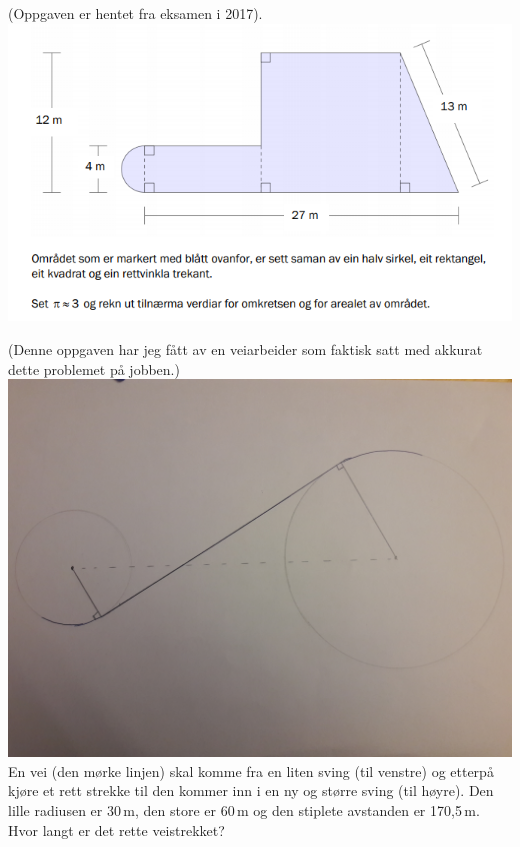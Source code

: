 (Oppgaven er hentet fra eksamen i 2017).\\
\includegraphics[scale=0.55]{eksv17}

\newpage
{}
(Denne oppgaven har jeg fått av en veiarbeider som faktisk satt med akkurat dette problemet på jobben.)\os
\includegraphics[scale=0.07]{vei}\os
En vei (den mørke linjen) skal komme fra en liten sving (til venstre) og etterpå kjøre et rett strekke til den kommer inn i en ny og større sving (til høyre).\os
Den lille radiusen er 30\,m, den store er 60\,m og den stiplete avstanden er 170,5\,m. Hvor langt er det rette veistrekket?
\nes

